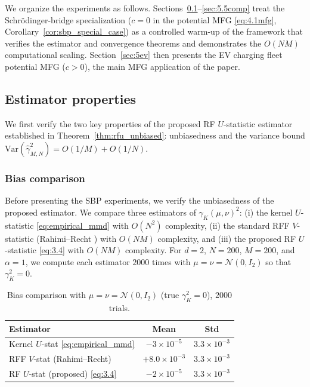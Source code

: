 \documentclass[11pt,leqno]{article}
\theoremstyle{plain}
\theoremstyle{remark}
\theoremstyle{definition}
\numberwithin{equation}{section}
\numberwithin{figure}{section}
\numberwithin{table}{section}
\numberwithin{algorithm}{section}
\begin{document}
We organize the experiments as follows.
Sections~\ref{sec:est_prop}--\ref{sec:5.5comp} treat the Schr{\"o}dinger-bridge specialization
($c=0$ in the potential MFG \eqref{eq:4.1mfg}, Corollary~\ref{cor:sbp_special_case})
as a controlled warm-up of the framework that
verifies the estimator and convergence theorems
and demonstrates the $O(NM)$ computational scaling.
Section~\ref{sec:5ev} then presents the EV charging fleet potential MFG ($c>0$),
the main MFG application of the paper.


\subsection{Estimator properties}\label{sec:est_prop}

We first verify the two key properties of the proposed RF $U$-statistic estimator
established in Theorem~\ref{thm:rfu_unbiased}: unbiasedness and the variance bound
$\mathrm{Var}(\hat{\gamma}_{M,N}^2) = O(1/M)+O(1/N)$.

\subsubsection{Bias comparison}\label{sec:5.1}

Before presenting the SBP experiments, we verify the unbiasedness of the proposed estimator.
We compare three estimators of $\gamma_K(\mu,\nu)^2$:
(i) the kernel $U$-statistic \eqref{eq:empirical_mmd} with $O(N^2)$ complexity,
(ii) the standard RFF $V$-statistic (Rahimi--Recht \cite{rah-rec:2007}) with $O(NM)$ complexity, and
(iii) the proposed RF $U$-statistic \eqref{eq:3.4} with $O(NM)$ complexity.
For $d=2$, $N=200$, $M=200$, and $\alpha=1$,
we compute each estimator $2000$ times with $\mu=\nu=\mathcal{N}(0,I_2)$ so that $\gamma_K^2=0$.

\begin{table}[htbp]
\centering
\caption{Bias comparison with $\mu=\nu=\mathcal{N}(0,I_2)$ (true $\gamma_K^2=0$), $2000$ trials.}
\label{tab:bias_same}
\begin{tabular}{lcc}
\toprule
Estimator & Mean & Std \\
\midrule
Kernel $U$-stat \eqref{eq:empirical_mmd} & $-3\times 10^{-5}$ & $3.3\times 10^{-3}$ \\
RFF $V$-stat (Rahimi--Recht) & $+8.0\times 10^{-3}$ & $3.3\times 10^{-3}$ \\
RF $U$-stat (proposed) \eqref{eq:3.4} & $-2\times 10^{-5}$ & $3.3\times 10^{-3}$ \\
\bottomrule
\end{tabular}
\end{table}
\end{document}
